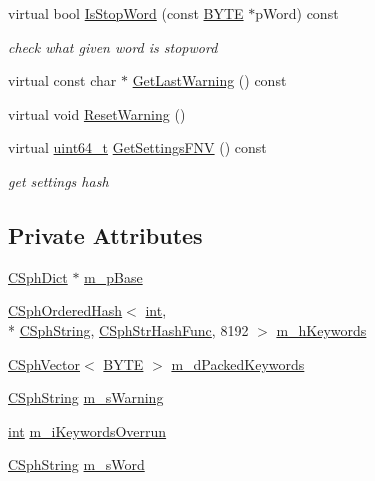 \begin{DoxyCompactItemize}
virtual bool \hyperlink{classCRtDictKeywords_a85f358d4e97bbf2b134a22cdb9fbaf1e}{Is\-Stop\-Word} (const \hyperlink{sphinxstd_8h_a4ae1dab0fb4b072a66584546209e7d58}{B\-Y\-T\-E} $\ast$p\-Word) const 
\begin{DoxyCompactList}\small\item\em check what given word is stopword \end{DoxyCompactList}\item 
virtual const char $\ast$ \hyperlink{classCRtDictKeywords_a4e326247025225245af170e74bd5f9ed}{Get\-Last\-Warning} () const 
\item 
virtual void \hyperlink{classCRtDictKeywords_a7fee69327bacaeea4f40edeea5bf6cfa}{Reset\-Warning} ()
\item 
virtual \hyperlink{sphinxstd_8h_aaa5d1cd013383c889537491c3cfd9aad}{uint64\-\_\-t} \hyperlink{classCRtDictKeywords_a8c35d3eaec9558bfd8926e23100d6afe}{Get\-Settings\-F\-N\-V} () const 
\begin{DoxyCompactList}\small\item\em get settings hash \end{DoxyCompactList}\end{DoxyCompactItemize}
\subsection*{Private Attributes}
\begin{DoxyCompactItemize}
\item 
\hyperlink{classCSphDict}{C\-Sph\-Dict} $\ast$ \hyperlink{classCRtDictKeywords_ab18501f9ae6fe2229615332af0552341}{m\-\_\-p\-Base}
\item 
\hyperlink{classCSphOrderedHash}{C\-Sph\-Ordered\-Hash}$<$ \hyperlink{sphinxexpr_8cpp_a4a26e8f9cb8b736e0c4cbf4d16de985e}{int}, \\*
\hyperlink{structCSphString}{C\-Sph\-String}, \hyperlink{structCSphStrHashFunc}{C\-Sph\-Str\-Hash\-Func}, 8192 $>$ \hyperlink{classCRtDictKeywords_abc178fcda0d8b64d9e794f44c141fd38}{m\-\_\-h\-Keywords}
\item 
\hyperlink{classCSphVector}{C\-Sph\-Vector}$<$ \hyperlink{sphinxstd_8h_a4ae1dab0fb4b072a66584546209e7d58}{B\-Y\-T\-E} $>$ \hyperlink{classCRtDictKeywords_a352490ae01283ea4d106f4a81aa93e70}{m\-\_\-d\-Packed\-Keywords}
\item 
\hyperlink{structCSphString}{C\-Sph\-String} \hyperlink{classCRtDictKeywords_ae318e9d3073da6b072a78ca72b06d2e5}{m\-\_\-s\-Warning}
\item 
\hyperlink{sphinxexpr_8cpp_a4a26e8f9cb8b736e0c4cbf4d16de985e}{int} \hyperlink{classCRtDictKeywords_ab4b8a8eb518d39264557bd4ac33102d7}{m\-\_\-i\-Keywords\-Overrun}
\item 
\hyperlink{structCSphString}{C\-Sph\-String} \hyperlink{classCRtDictKeywords_a834c592176bd91130cf0b398a82d6404}{m\-\_\-s\-Word}
\end{DoxyCompactItemize}
